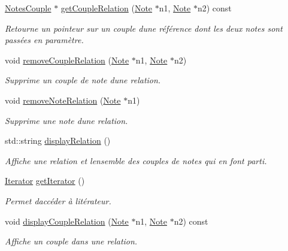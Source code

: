 \begin{DoxyCompactItemize}
\hyperlink{class_notes_couple}{Notes\+Couple} $\ast$ \hyperlink{class_relation_a086c39ecf396e3cfcb465fd9eea5a904}{get\+Couple\+Relation} (\hyperlink{class_note}{Note} $\ast$n1, \hyperlink{class_note}{Note} $\ast$n2) const
\begin{DoxyCompactList}\small\item\em Retourne un pointeur sur un couple d\textquotesingle{}une référence dont les deux notes sont passées en paramètre. \end{DoxyCompactList}\item 
void \hyperlink{class_relation_ab81e16d688dcb4703e8ab299fef80c10}{remove\+Couple\+Relation} (\hyperlink{class_note}{Note} $\ast$n1, \hyperlink{class_note}{Note} $\ast$n2)
\begin{DoxyCompactList}\small\item\em Supprime un couple de note d\textquotesingle{}une relation. \end{DoxyCompactList}\item 
void \hyperlink{class_relation_a8f25fe0ab5bf722eb08d2dd31e99c7f4}{remove\+Note\+Relation} (\hyperlink{class_note}{Note} $\ast$n1)
\begin{DoxyCompactList}\small\item\em Supprime une note d\textquotesingle{}une relation. \end{DoxyCompactList}\item 
\mbox{\label{class_relation_a0b8a359787fe32c991710039fd081f97}} 
std\+::string \hyperlink{class_relation_a0b8a359787fe32c991710039fd081f97}{display\+Relation} ()
\begin{DoxyCompactList}\small\item\em Affiche une relation et l\textquotesingle{}ensemble des couples de notes qui en font parti. \end{DoxyCompactList}\item 
\hyperlink{class_relation_1_1_iterator}{Iterator} \hyperlink{class_relation_aedcb559cf6471c8eb731026e45fd00a0}{get\+Iterator} ()
\begin{DoxyCompactList}\small\item\em Permet d\textquotesingle{}accéder à l\textquotesingle{}itérateur. \end{DoxyCompactList}\item 
void \hyperlink{class_relation_aa6974a453611dee90f2ca2da9fe30de6}{display\+Couple\+Relation} (\hyperlink{class_note}{Note} $\ast$n1, \hyperlink{class_note}{Note} $\ast$n2) const
\begin{DoxyCompactList}\small\item\em Affiche un couple dans une relation. \end{DoxyCompactList}\end{DoxyCompactItemize}


